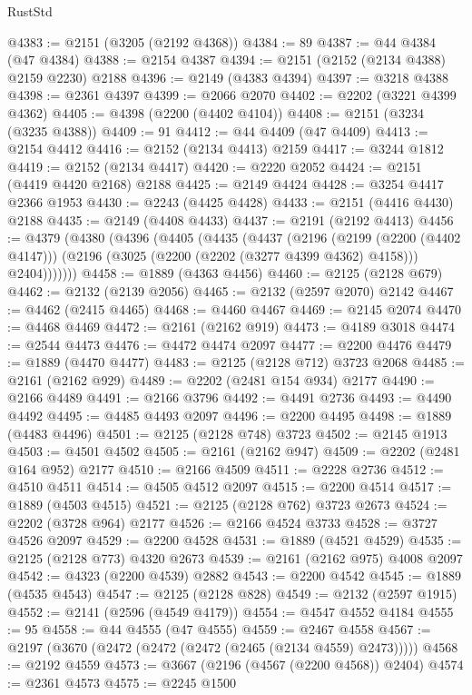 \begin{lexlean}{RustStd}
\begin{coremodule}
@4383 := @2151 (@3205 (@2192 @4368))
@4384 := 89
@4387 := @44 @4384 (@47 @4384)
@4388 := @2154 @4387
@4394 := @2151 (@2152 (@2134 @4388) @2159 @2230) @2188
@4396 := @2149 (@4383 @4394)
@4397 := @3218 @4388
@4398 := @2361 @4397
@4399 := @2066 @2070
@4402 := @2202 (@3221 @4399 @4362)
@4405 := @4398 (@2200 (@4402 @4104))
@4408 := @2151 (@3234 (@3235 @4388))
@4409 := 91
@4412 := @44 @4409 (@47 @4409)
@4413 := @2154 @4412
@4416 := @2152 (@2134 @4413) @2159
@4417 := @3244 @1812
@4419 := @2152 (@2134 @4417)
@4420 := @2220 @2052
@4424 := @2151 (@4419 @4420 @2168) @2188
@4425 := @2149 @4424
@4428 := @3254 @4417 @2366 @1953
@4430 := @2243 (@4425 @4428)
@4433 := @2151 (@4416 @4430) @2188
@4435 := @2149 (@4408 @4433)
@4437 := @2191 (@2192 @4413)
@4456 := @4379
    (@4380
      (@4396
        (@4405
          (@4435
            (@4437
              (@2196
                (@2199 (@2200 (@4402 @4147)))
                (@2196 (@3025 (@2200 (@2202 (@3277 @4399 @4362) @4158))) @2404)))))))
@4458 := @1889 (@4363 @4456)
@4460 := @2125 (@2128 @679)
@4462 := @2132 (@2139 @2056)
@4465 := @2132 (@2597 @2070) @2142
@4467 := @4462 (@2415 @4465)
@4468 := @4460 @4467
@4469 := @2145 @2074
@4470 := @4468 @4469
@4472 := @2161 (@2162 @919)
@4473 := @4189 @3018
@4474 := @2544 @4473
@4476 := @4472 @4474 @2097
@4477 := @2200 @4476
@4479 := @1889 (@4470 @4477)
@4483 := @2125 (@2128 @712) @3723 @2068
@4485 := @2161 (@2162 @929)
@4489 := @2202 (@2481 @154 @934) @2177
@4490 := @2166 @4489
@4491 := @2166 @3796
@4492 := @4491 @2736
@4493 := @4490 @4492
@4495 := @4485 @4493 @2097
@4496 := @2200 @4495
@4498 := @1889 (@4483 @4496)
@4501 := @2125 (@2128 @748) @3723
@4502 := @2145 @1913
@4503 := @4501 @4502
@4505 := @2161 (@2162 @947)
@4509 := @2202 (@2481 @164 @952) @2177
@4510 := @2166 @4509
@4511 := @2228 @2736
@4512 := @4510 @4511
@4514 := @4505 @4512 @2097
@4515 := @2200 @4514
@4517 := @1889 (@4503 @4515)
@4521 := @2125 (@2128 @762) @3723 @2673
@4524 := @2202 (@3728 @964) @2177
@4526 := @2166 @4524 @3733
@4528 := @3727 @4526 @2097
@4529 := @2200 @4528
@4531 := @1889 (@4521 @4529)
@4535 := @2125 (@2128 @773) @4320 @2673
@4539 := @2161 (@2162 @975) @4008 @2097
@4542 := @4323 (@2200 @4539) @2882
@4543 := @2200 @4542
@4545 := @1889 (@4535 @4543)
@4547 := @2125 (@2128 @828)
@4549 := @2132 (@2597 @1915)
@4552 := @2141 (@2596 (@4549 @4179))
@4554 := @4547 @4552 @4184
@4555 := 95
@4558 := @44 @4555 (@47 @4555)
@4559 := @2467 @4558
@4567 := @2197 (@3670 (@2472 (@2472 (@2472 (@2465 (@2134 @4559) @2473)))))
@4568 := @2192 @4559
@4573 := @3667 (@2196 (@4567 (@2200 @4568)) @2404)
@4574 := @2361 @4573
@4575 := @2245 @1500

\end{coremodule}
\end{lexlean}
